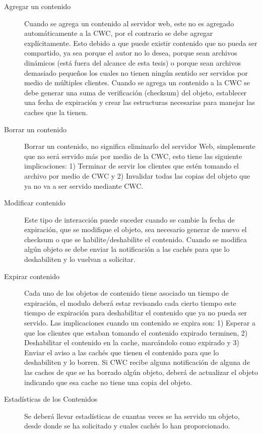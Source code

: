 \begin{description}
\item[Agregar un contenido] Cuando se agrega un contenido al servidor web, este no es agregado automáticamente a la CWC, por el contrario se debe agregar explícitamente. Esto debido a que puede existir contenido que no pueda ser compartido, ya sea porque el autor no lo desea, porque sean archivos dinámicos (está fuera del alcance de esta tesis) o porque sean archivos demasiado pequeños los cuales no tienen ningún sentido ser servidos por medio de múltiples clientes. Cuando se agrega un contenido a la CWC se debe generar una suma de verificación (checksum) del objeto, establecer una fecha de expiración y crear las estructuras necesarias para manejar las caches que la tienen.

\item[Borrar un contenido] Borrar un contenido, no significa eliminarlo del servidor Web, simplemente que no será servido más por medio de la CWC, esto tiene las siguiente implicaciones: 1) Terminar de servir los clientes que estén tomando el archivo por medio de CWC y 2) Invalidar todas las copias del objeto que ya no va a ser servido mediante CWC.

\item [Modificar contenido] Este tipo de interacción puede suceder cuando se cambie la fecha de expiración, que se modifique el objeto, sea necesario generar de nuevo el checksum o que se habilite/deshabilite el contenido. Cuando se modifica algún objeto se debe enviar la notificación a las cachés para que lo deshabiliten y lo vuelvan a solicitar.

\item [Expirar contenido] Cada uno de los objetos de contenido tiene asociado un tiempo de expiración, el modulo deberá estar revisando cada cierto tiempo este tiempo de expiración para deshabilitar el contenido que ya no pueda ser servido. Las implicaciones cuando un contenido se expira son: 1) Esperar a que los clientes que estaban tomando el contenido expirado terminen, 2) Deshabilitar el contenido en la cache, marcándolo como expirado y 3) Enviar el aviso a las cachés que tienen el contenido para que lo deshabiliten y lo borren.
Si CWC recibe alguna notificación de alguna de las caches de que se ha borrado algún objeto, deberá de actualizar el objeto indicando que esa cache no tiene una copia del objeto.

\item[Estadísticas de los Contenidos] Se deberá llevar estadísticas de cuantas veces se ha servido un objeto, desde donde se ha solicitado y cuales cachés lo han proporcionado.
\end{description}

